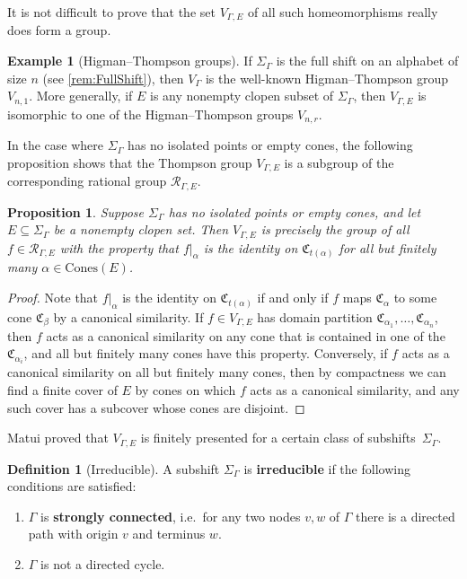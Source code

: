 \documentclass[11pt,letterpaper]{amsart}
\newtheorem{proposition}[theorem]{Proposition}
\theoremstyle{definition}
\newtheorem{definition}[theorem]{Definition}
\newtheorem{example}[theorem]{Example}
\newcommand{\newword}[1]{\textbf{#1}}
\newcommand{\R}{\mathcal{R}}
\newcommand{\C}{\mathfrak{C}}
\newcommand{\Cones}{\mathrm{Cones}}
\begin{document}
It is not difficult to prove that the set $V_{\Gamma,E}$ of all such homeomorphisms really does form a group.

\begin{example}[Higman--Thompson groups]\label{ex:V} If $\Sigma_\Gamma$ is the full shift on an alphabet of size $n$ (see \cref{rem:FullShift}), then $V_\Gamma$ is the well-known Higman--Thompson group $V_{n,1}$.  More generally, if $E$ is any nonempty clopen subset of $\Sigma_{\Gamma}$, then $V_{\Gamma,E}$ is isomorphic to one of the Higman--Thompson groups $V_{n,r}$.
\end{example}

In the case where $\Sigma_\Gamma$ has no isolated points or empty cones, the following proposition shows that the Thompson group $V_{\Gamma,E}$ is a subgroup of the corresponding rational group $\R_{\Gamma,E}$.

\begin{proposition}
Suppose $\Sigma_\Gamma$ has no isolated points or empty cones, and let $E\subseteq \Sigma_\Gamma$ be a nonempty clopen set.  Then $V_{\Gamma,E}$ is precisely the group of all $f\in \R_{\Gamma,E}$ with the property that $f|_{\alpha}$ is the identity on $\C_{t(\alpha)}$ for all but finitely many $\alpha\in\Cones(E)$.
\end{proposition}

\begin{proof}
Note that $f|_\alpha$ is the identity on $\C_{t(\alpha)}$ if and only if $f$ maps $\C_\alpha$ to some cone $\C_\beta$ by a canonical similarity.  If $f\in V_{\Gamma,E}$ has domain partition $\C_{\alpha_1},\ldots,\C_{\alpha_n}$, then $f$ acts as a canonical similarity on any cone that is contained in one of the $\C_{\alpha_i}$, and all but finitely many cones have this property.  Conversely, if $f$ acts as a canonical similarity on all but finitely many cones, then by compactness we can find a finite cover of $E$ by cones on which $f$ acts as a canonical similarity, and any such cover has a subcover whose cones are disjoint.
\end{proof}

Matui proved that $V_{\Gamma,E}$ is finitely presented for a certain class of subshifts~$\Sigma_\Gamma$.

\begin{definition}[Irreducible]
A subshift $\Sigma_\Gamma$ is  \newword{irreducible} if the following conditions are satisfied:
\begin{enumerate}
    \item $\Gamma$ is \newword{strongly connected}, i.e.\ for any two nodes $v,w$ of $\Gamma$ there is a directed path with origin $v$ and terminus $w$.\smallskip
    \item $\Gamma$ is not a directed cycle.
\end{enumerate}
\end{definition}
\end{document}
